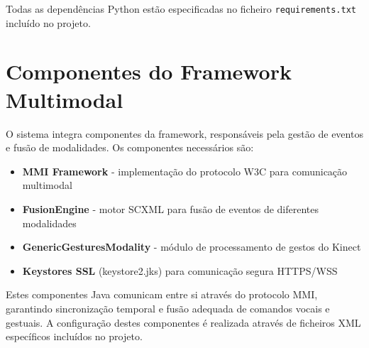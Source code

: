 \documentclass{report}
\begin{document}
Todas as dependências Python estão especificadas no ficheiro \texttt{requirements.txt} incluído no projeto.

\section{Componentes do Framework Multimodal}

O sistema integra componentes da framework, responsáveis pela gestão de eventos e fusão de modalidades. Os componentes necessários são:

\begin{itemize}
    \item \textbf{MMI Framework} - implementação do protocolo W3C para comunicação multimodal
    \item \textbf{FusionEngine} - motor SCXML para fusão de eventos de diferentes modalidades
    \item \textbf{GenericGesturesModality} - módulo de processamento de gestos do Kinect
    \item \textbf{Keystores SSL} (keystore2.jks) para comunicação segura HTTPS/WSS
\end{itemize}

Estes componentes Java comunicam entre si através do protocolo MMI, garantindo sincronização temporal e fusão adequada de comandos vocais e gestuais. A configuração destes componentes é realizada através de ficheiros XML específicos incluídos no projeto.


\end{document}
